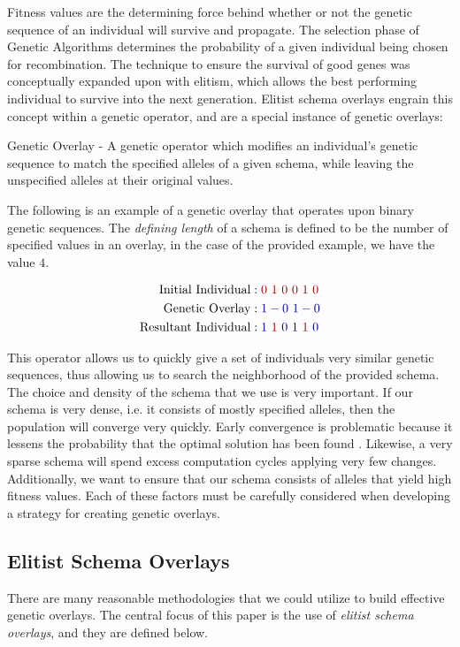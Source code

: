 Fitness values are the determining force behind whether or not the genetic sequence of an individual will survive and propagate. The selection phase of Genetic Algorithms determines the probability of a given individual being chosen for recombination. The technique to ensure the survival of good genes was conceptually expanded upon with elitism, which allows the best performing individual to survive into the next generation. Elitist schema overlays engrain this concept within a genetic operator, and are a special instance of genetic overlays:

\begin{overlay}
Genetic Overlay - A genetic operator which modifies an individual's genetic sequence to match the specified alleles of a given schema, while leaving the unspecified alleles at their original values. 
\end{overlay}

The following is an example of a genetic overlay that operates upon binary genetic sequences. The \emph{defining length} of a schema is defined to be the number of specified values in an overlay, in the case of the provided example, we have the value $4$.

\begin{align*}
\text{Initial Individual} &: {\color{myred}0~1~0~0~1~0} 		\\
\text{Genetic Overlay} &: {\color{myblue}1-0~1-0}				\\
\text{Resultant Individual} &: {\color{myblue}1}~{\color{myred}1}~{\color{myblue}0~1}~{\color{myred}1}~{\color{myblue}0}	
\end{align*}

This operator allows us to quickly give a set of individuals very similar genetic sequences, thus allowing us to search the neighborhood of the provided schema. The choice and density of the schema that we use is very important. If our schema is very dense, i.e. it consists of mostly specified alleles, then the population will converge very quickly. Early convergence is problematic because it lessens the probability that the optimal solution has been found \cite{Deb99}. Likewise, a very sparse schema will spend excess computation cycles applying very few changes. Additionally, we want to ensure that our schema consists of alleles that yield high fitness values. Each of these factors must be carefully considered when developing a strategy for creating genetic overlays. 

\subsection*{Elitist Schema Overlays}
There are many reasonable methodologies that we could utilize to build effective genetic overlays. The central focus of this paper is the use of \emph{elitist schema overlays}, and they are defined below.

